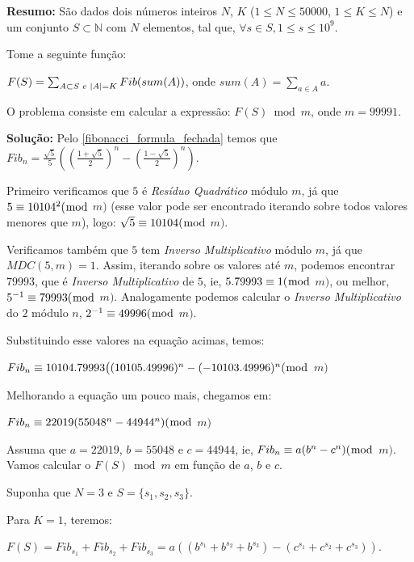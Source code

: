 \textbf{Resumo:}
São dados dois números inteiros $N$, $K$ ($1 \leq N \leq 50000$, $1 \leq K \leq N$) e um conjunto $S \subset \mathbb{N}$ com $N$ elementos, tal que, $\forall s \in S, 1 \leq s \leq 10^9$.

Tome a seguinte função:

$F(S) = \sum_{A \subset S \hspace{1mm} e\hspace{1mm} |A| = K}^{} Fib(sum(A))$, onde $sum(A) = \sum_{a \in A}a$. %

O problema consiste em calcular a expressão:  
$F(S) \bmod m$, onde $m = 99991$.
\newline

\textbf{Solução:}
Pelo \autoref{fibonacci_formula_fechada} temos que $Fib_n = \frac{\sqrt{5}}{5}((\frac{1+\sqrt{5}}{2})^n - (\frac{1-\sqrt{5}}{2})^n)$.

Primeiro verificamos que $5$ é \textit{Resíduo Quadrático} módulo $m$, já que $5 \equiv 10104^2(\bmod$ $m)$ (esse valor pode
ser encontrado iterando sobre todos valores menores que $m$), logo: $\sqrt{5} \equiv 10104(\bmod$ $m)$.

Verificamos também que $5$ tem \textit{Inverso Multiplicativo} módulo $m$, já que $MDC(5,m)=1$. Assim, iterando sobre os valores até $m$, podemos encontrar $79993$, que é \textit{Inverso Multiplicativo} de $5$, ie, $5.79993 \equiv 1(\bmod$ $m)$, ou melhor, $5^{-1} \equiv 79993(\bmod$ $m)$.
Analogamente podemos calcular o \textit{Inverso Multiplicativo} do $2$ módulo $n$, $2^{-1} \equiv 49996(\bmod$ $m)$.

Substituindo esse valores na equação acimas, temos:
\newline

$Fib_n \equiv 10104.79993 \big( (10105.49996)^n - (-10103.49996)^n (\bmod$ $m)$ 
\newline

Melhorando a equação um pouco mais, chegamos em:
\newline

$Fib_n\equiv 22019(55048^n - 44944^n)(\bmod$ $m)$
\newline

Assuma que $a=22019$, $b=55048$ e $c=44944$, ie, $Fib_n \equiv a(b^n-c^n)(\bmod$ $m)$. Vamos calcular o $F(S) \bmod m$ em função de $a$, $b$ e $c$.

Suponha que $N=3$ e $S=\{s_1, s_2, s_3\}$. 

Para $K=1$, teremos:

$F(S) = Fib_{s_1}+Fib_{s_2}+Fib_{s_3} = a((b^{s_1}+b^{s_2}+b^{s_3}) - (c^{s_1}+c^{s_2}+c^{s_3}))$.

